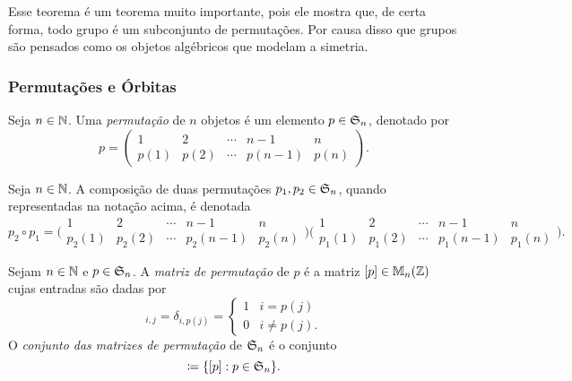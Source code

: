 	Esse teorema é um teorema muito importante, pois ele mostra que, de certa forma, todo grupo é um subconjunto de permutações. Por causa disso que grupos são pensados como os objetos algébricos que modelam a simetria.

\subsubsection{Permutações e Órbitas}

\begin{defi} Seja $n \in \mathbb{N}$. Uma \emph{permutação} de $n$ objetos é um elemento $p \in \mathfrak{S}_n$, denotado por
	\begin{equation*}
	p = \begin{pmatrix}
				1 & 2 & \cdots & n-1 & n \\
				p(1) & p(2) & \cdots &  p(n-1)  & p(n)
			\end{pmatrix}.
	\end{equation*}
\end{defi}

\begin{nota}
	Seja $n \in \mathbb{N}$. A composição de duas permutações $p_1,p_2 \in \mathfrak{S}_n$, quando representadas na notação acima, é denotada
	\begin{equation*}
	p_2 \circ p_1 = \bigl(\begin{smallmatrix}
				1 & 2 & \cdots & n-1 & n \\
				p_2(1) & p_2(2) & \cdots &  p_2(n-1)  & p_2(n)
			\end{smallmatrix}\bigr)
			\bigl(\begin{smallmatrix}
				1 & 2 & \cdots & n-1 & n \\
				p_1(1) & p_1(2) & \cdots &  p_1(n-1)  & p_1(n)
			\end{smallmatrix}\bigr).
	\end{equation*}
\end{nota}

\begin{defi}
	Sejam $n \in \mathbb{N}$ e $p \in \mathfrak{S}_n$. A \emph{matriz de permutação} de $p$ é a matriz $[p] \in \mathbb M_n (\mathbb{Z})$ cujas entradas são dadas por
	\begin{equation*}
		[p]_{i,j} = \delta_{i,p(j)} = \begin{cases}
												1 & i=p(j) \\
												0 & i \neq p(j).
												\end{cases}
	\end{equation*}
	O \emph{conjunto das matrizes de permutação} de $\mathfrak{S}_n$ é o conjunto
	\begin{equation*}
		[\sime_n] \coloneqq \{[p] : p \in \sime_n\}.
	\end{equation*}
\end{defi}

